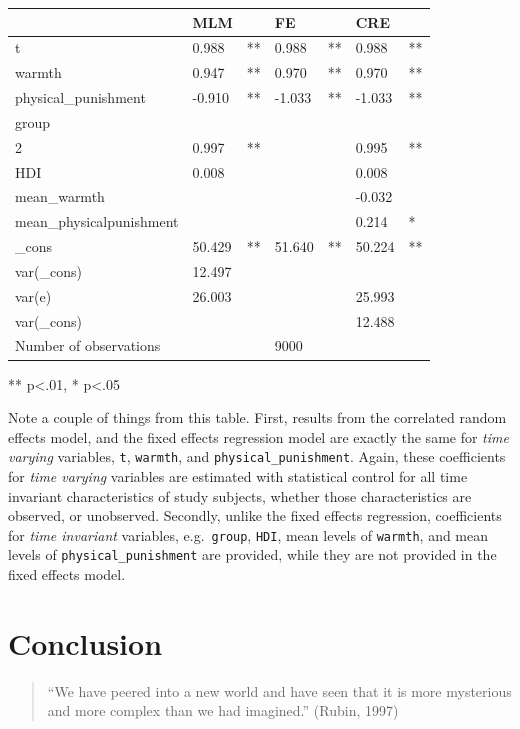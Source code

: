\documentclass[
  letterpaper,
  DIV=11,
  numbers=noendperiod]{scrreprt}
\begin{document}
\begin{longtable}[]{@{}lllllll@{}}
\toprule()
& MLM & & FE & & CRE & \\
\midrule()
\endhead
t & 0.988 & ** & 0.988 & ** & 0.988 & ** \\
warmth & 0.947 & ** & 0.970 & ** & 0.970 & ** \\
physical\_punishment & -0.910 & ** & -1.033 & ** & -1.033 & ** \\
group & & & & & & \\
2 & 0.997 & ** & & & 0.995 & ** \\
HDI & 0.008 & & & & 0.008 & \\
mean\_warmth & & & & & -0.032 & \\
mean\_physicalpunishment & & & & & 0.214 & * \\
\_cons & 50.429 & ** & 51.640 & ** & 50.224 & ** \\
var(\_cons) & 12.497 & & & & & \\
var(e) & 26.003 & & & & 25.993 & \\
var(\_cons) & & & & & 12.488 & \\
Number of observations & & & 9000 & & & \\
\bottomrule()
\end{longtable}

** p\textless.01, * p\textless.05

Note a couple of things from this table. First, results from the
correlated random effects model, and the fixed effects regression model
are exactly the same for \emph{time varying} variables, \texttt{t},
\texttt{warmth}, and \texttt{physical\_punishment}. Again, these
coefficients for \emph{time varying} variables are estimated with
statistical control for all time invariant characteristics of study
subjects, whether those characteristics are observed, or unobserved.
Secondly, unlike the fixed effects regression, coefficients for
\emph{time invariant} variables, e.g.~\texttt{group}, \texttt{HDI}, mean
levels of \texttt{warmth}, and mean levels of
\texttt{physical\_punishment} are provided, while they are not provided
in the fixed effects model.


\hypertarget{conclusion}{%
\chapter{Conclusion}\label{conclusion}}

\begin{quote}
``We have peered into a new world and have seen that it is more
mysterious and more complex than we had imagined.'' (Rubin, 1997)
\end{quote}
\end{document}
